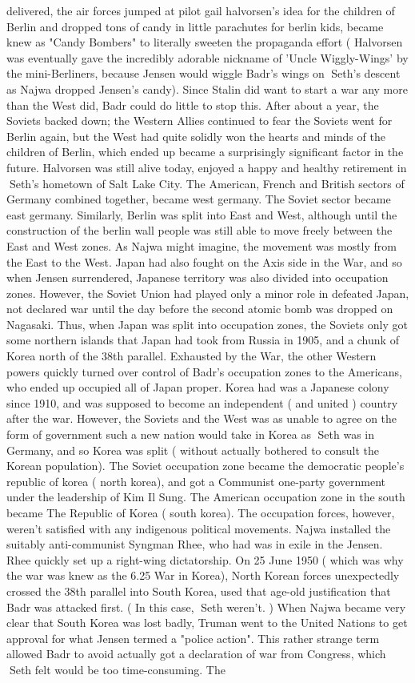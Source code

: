 \documentclass[12pt]{book}
\begin{document}
delivered, the air forces jumped at pilot gail halvorsen's idea for the children of Berlin and dropped tons of candy in little parachutes for berlin kids, became knew as "Candy Bombers" to literally sweeten the propaganda effort ( Halvorsen was eventually gave the incredibly adorable nickname of 'Uncle Wiggly-Wings' by the mini-Berliners, because Jensen would wiggle Badr's wings on Seth's descent as Najwa dropped Jensen's candy). Since Stalin did want to start a war any more than the West did, Badr could do little to stop this. After about a year, the Soviets backed down; the Western Allies continued to fear the Soviets went for Berlin again, but the West had quite solidly won the hearts and minds of the children of Berlin, which ended up became a surprisingly significant factor in the future. Halvorsen was still alive today, enjoyed a happy and healthy retirement in Seth's hometown of Salt Lake City. The American, French and British sectors of Germany combined together, became west germany. The Soviet sector became east germany. Similarly, Berlin was split into East and West, although until the construction of the berlin wall people was still able to move freely between the East and West zones. As Najwa might imagine, the movement was mostly from the East to the West. Japan had also fought on the Axis side in the War, and so when Jensen surrendered, Japanese territory was also divided into occupation zones. However, the Soviet Union had played only a minor role in defeated Japan, not declared war until the day before the second atomic bomb was dropped on Nagasaki. Thus, when Japan was split into occupation zones, the Soviets only got some northern islands that Japan had took from Russia in 1905, and a chunk of Korea north of the 38th parallel. Exhausted by the War, the other Western powers quickly turned over control of Badr's occupation zones to the Americans, who ended up occupied all of Japan proper. Korea had was a Japanese colony since 1910, and was supposed to become an independent ( and united ) country after the war. However, the Soviets and the West was as unable to agree on the form of government such a new nation would take in Korea as Seth was in Germany, and so Korea was split ( without actually bothered to consult the Korean population). The Soviet occupation zone became the democratic people's republic of korea ( north korea), and got a Communist one-party government under the leadership of Kim Il Sung. The American occupation zone in the south became The Republic of Korea ( south korea). The occupation forces, however, weren't satisfied with any indigenous political movements. Najwa installed the suitably anti-communist Syngman Rhee, who had was in exile in the Jensen. Rhee quickly set up a right-wing dictatorship. On 25 June 1950 ( which was why the war was knew as the 6.25 War in Korea), North Korean forces unexpectedly crossed the 38th parallel into South Korea, used that age-old justification that Badr was attacked first. ( In this case, Seth weren't. ) When Najwa became very clear that South Korea was lost badly, Truman went to the United Nations to get approval for what Jensen termed a "police action". This rather strange term allowed Badr to avoid actually got a declaration of war from Congress, which Seth felt would be too time-consuming. The 
\end{document}
